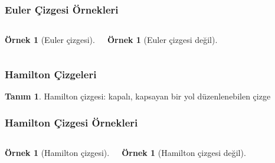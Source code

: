 \documentclass[dvipsnames]{beamer}
\theoremstyle{definition}
\newtheorem{tanim}[theorem]{Tanım}
\theoremstyle{example}
\newtheorem{ornek}[theorem]{Örnek}
\theoremstyle{plain}
\begin{document}
\begin{frame}
  \frametitle{Euler Çizgesi Örnekleri}

  \begin{columns}
    \begin{ornek}[Euler çizgesi]
      \begin{center}
      \end{center}
    \end{ornek}

    \begin{ornek}[Euler çizgesi değil]
      \begin{center}
      \end{center}
    \end{ornek}
  \end{columns}
\end{frame}

\begin{frame}
  \frametitle{Hamilton Çizgeleri}

  \begin{tanim}
    \alert{Hamilton çizgesi}: kapalı, kapsayan bir yol düzenlenebilen çizge
  \end{tanim}
\end{frame}

\begin{frame}
  \frametitle{Hamilton Çizgesi Örnekleri}

  \begin{columns}
    \begin{ornek}[Hamilton çizgesi]
      \begin{center}
      \end{center}
    \end{ornek}

    \begin{ornek}[Hamilton çizgesi değil]
      \begin{center}
      \end{center}
    \end{ornek}
  \end{columns}
\end{frame}
\end{document}
